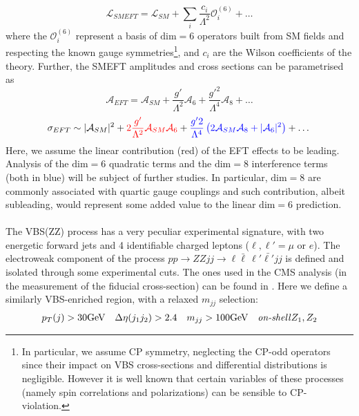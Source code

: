 \begin{equation}
\mathcal{L}_{SMEFT} = \mathcal{L}_{SM} + \sum_i \frac{c_i}{\Lambda^2} \mathcal{O}_i^{(6)} + \dots 
\end{equation}
%
where the $\mathcal{O}^{(6)}_i$ represent a basis of $\mathrm{dim=6}$ operators built from SM fields and respecting the known gauge symmetries\footnote{In particular, we assume CP symmetry, neglecting the CP-odd operators since their impact on VBS cross-sections and differential distributions is negligible. However it is well known that certain variables of these processes (namely spin correlations and polarizations) can be sensible to CP-violation.}, and $c_i$ are the Wilson coefficients of the theory. Further, the SMEFT amplitudes and cross sections can be parametrised as
%
\begin{equation}
\mathcal{A}_{EFT} = \mathcal{A}_{SM} + \frac{g'}{\Lambda^2} \mathcal{A}_{6} +   \frac{g'^2}{\Lambda^4} \mathcal{A}_{8} + \dots 
\end{equation}
%
\begin{equation}
 \sigma_{EFT} \sim \vert \mathcal{A}_{SM} \vert^2 + {\color{red} 2\frac{g'}{\Lambda^2} \mathcal{A}_{SM} \mathcal{A}_{6} } + {\color{blue} \frac{g'2}{\Lambda^4} \left(  2 \mathcal{A}_{SM} \mathcal{A}_{8} + \vert \mathcal{A}_{6} \vert^2 \right)} + \dots
\end{equation}
%
Here, we assume the linear contribution (red) of the EFT effects to be leading. Analysis of the $\mathrm{dim=6}$ quadratic terms and the $\mathrm{dim=8}$ interference terms (both in blue) will be subject of further studies.  In particular, $\mathrm{dim=8}$ are commonly associated with quartic gauge couplings and such contribution, albeit subleading, would represent some added value to the linear $\mathrm{dim=6}$ prediction. \\
 
\\
The VBS(ZZ) process has a very peculiar experimental signature, with two energetic forward jets and 4 identifiable charged leptons ($\ell, \ell' = \mu$ or $e$).
The electroweak component of the process $p p \to Z Z j j \to \ell \bar{\ell} \, \ell' \bar{\ell'} j j$ is defined and isolated through some experimental cuts. The ones used in the CMS analysis (in the measurement of the fiducial cross-section) can be found in \cite{Sirunyan:2017fvv}. Here we define a similarly VBS-enriched region, with a relaxed $m_{jj}$ selection: %
%
\begin{eqnarray}
p_T (j) > 30 \textrm{GeV} \quad \Delta \eta (j_1 j_2) > 2.4\quad m_{jj} > 100 \textrm{GeV}\quad \textrm{\emph{on-shell}}Z_1,Z_2
\end{eqnarray}
%

